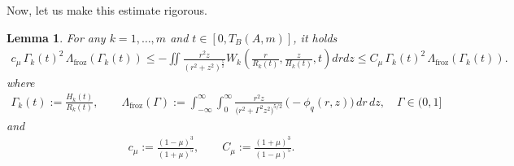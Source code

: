 \documentclass[reqno,11pt]{amsart}
\newtheorem{lemma}[theorem]{Lemma}
\begin{document}
Now, let us make this estimate rigorous.
    \begin{lemma}
    \label{lem:pro_est}
        For any $k=1,\ldots,m$ and $t\in[0,T_B(A,m)]$, it holds
            \begin{align}
            \label{heu05}
            c_\mu
                \, 
                \Gamma_k(t)^2
                \,
                \Lambda_{\mathrm{froz}} (\Gamma_k(t))
            \leq
                -\iint \frac{r^2 z}{(r^2+z^2)^{\frac{5}{2}}} W_k
                \left(
                    \frac{r}{R_k (t)},
                    \frac{z}{H_k(t)}, t
                \right)
                 dr dz
            \leq
                C_\mu 
                \, 
                \Gamma_k(t)^2
                \,
                \Lambda_{\mathrm{froz}} (\Gamma_k(t)).
            \end{align}
        where
            \begin{align*}
                \Gamma_k(t) :=\frac{H_k(t)}{R_k(t)},
            \qquad 
            \Lambda_{\mathrm{froz}}(\Gamma):=\int_{-\infty}^\infty \int_0^\infty\frac{r^2 z}{\big(r^2+\Gamma^2 z^2\big)^{5/2}}\, \big(-\phi_q(r,z)\big)\,dr\,dz,
\quad \Gamma\in (0,1]
            \end{align*}
        and
            \begin{align*}
                c_\mu:= \frac{(1-\mu)^3}{(1+\mu)^5},
            \qquad
                C_\mu:=\frac{(1+\mu)^3}{(1-\mu)^5}.
            \end{align*}
    \end{lemma}
\end{document}
